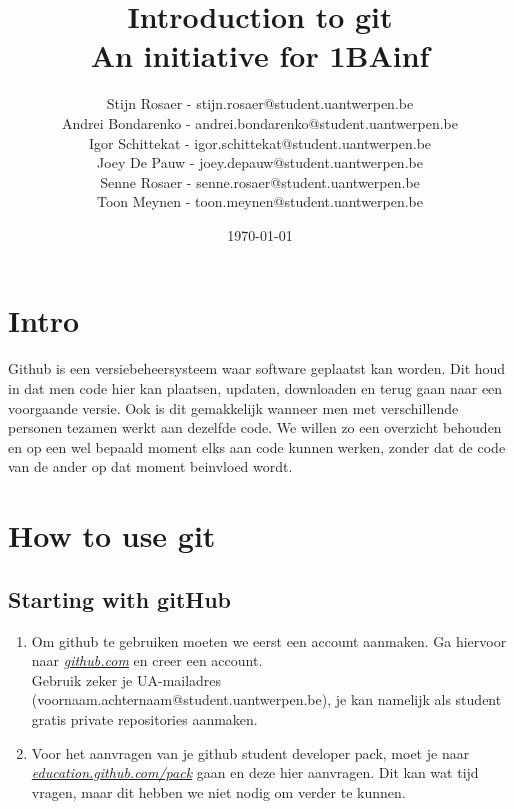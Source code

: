 \documentclass[a4paper, titlepage]{article}
\begin{document}
	\title{Introduction to git\\ \large An initiative for 1BAinf}
	\date{\today}

	\author{Stijn Rosaer - stijn.rosaer@student.uantwerpen.be\\
	Andrei Bondarenko - andrei.bondarenko@student.uantwerpen.be\\
		Igor Schittekat - igor.schittekat@student.uantwerpen.be\\
	Joey De Pauw - joey.depauw@student.uantwerpen.be\\
	Senne Rosaer - senne.rosaer@student.uantwerpen.be\\
	Toon Meynen - toon.meynen@student.uantwerpen.be
	}
	\maketitle
	
	\tableofcontents
	\section{Intro}
		Github is een versiebeheersysteem waar software geplaatst kan worden. Dit houd in dat men code hier kan plaatsen, updaten, downloaden en terug gaan naar een voorgaande versie. Ook is dit gemakkelijk wanneer men met verschillende personen tezamen werkt aan dezelfde code. We willen zo een overzicht behouden en op een wel bepaald moment elks aan code kunnen werken, zonder dat de code van de ander op dat moment beinvloed wordt.
	

	\pagebreak
	
	\section{How to use git}
		\subsection{Starting with gitHub}
			\begin{enumerate}
				\item Om github te gebruiken moeten we eerst een account aanmaken. Ga hiervoor naar \href{https://github.com/}{\textit{github.com}} en creer een account.\\	
				Gebruik zeker je UA-mailadres (voornaam.achternaam@student.uantwerpen.be), je kan namelijk als student gratis private repositories aanmaken.
				\item Voor het aanvragen van je github student developer pack, moet je naar  \href{https://education.github.com/pack}{\textit{education.github.com/pack}} gaan en deze hier aanvragen. Dit kan wat tijd vragen, maar dit hebben we niet nodig om verder te kunnen.
			\end{enumerate}
\end{document}
